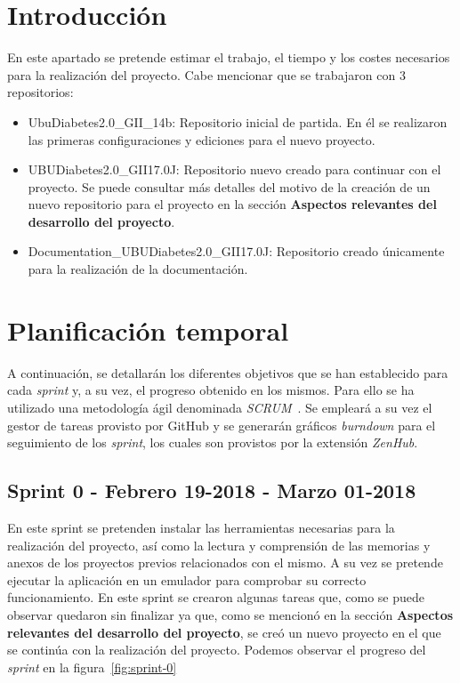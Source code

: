 
\section{Introducción}
En este apartado se pretende estimar el trabajo, el tiempo y los costes necesarios para la realización del proyecto.
Cabe mencionar que se trabajaron con 3 repositorios:
\begin{itemize}
	\item UbuDiabetes2.0\_GII\_14b: Repositorio inicial de partida. En él se realizaron las primeras configuraciones y ediciones para el nuevo proyecto.
	\item UBUDiabetes2.0\_GII17.0J: Repositorio nuevo creado para continuar con el proyecto. Se puede consultar más detalles del motivo de la creación de un nuevo repositorio para el proyecto en la sección \textbf{Aspectos relevantes del desarrollo del proyecto}.
	\item Documentation\_UBUDiabetes2.0\_GII17.0J: Repositorio creado únicamente para la realización de la documentación.
\end{itemize}



\section{Planificación temporal}
A continuación, se detallarán los diferentes objetivos que se han establecido para cada \textit{sprint} y, a su vez, el progreso obtenido en los mismos. Para ello se ha utilizado una metodología ágil denominada \textit{SCRUM}~\cite{schwaber2002agile}. Se empleará a su vez el gestor de tareas provisto por GitHub y se generarán gráficos \textit{burndown} para el seguimiento de los \textit{sprint}, los cuales son provistos por la extensión \textit{ZenHub}.
\subsection{Sprint 0 - Febrero 19-2018 - Marzo 01-2018}
En este sprint se pretenden instalar las herramientas necesarias para la realización del proyecto, así como la lectura y comprensión de las memorias y anexos de los proyectos previos relacionados con el mismo. A su vez se pretende ejecutar la aplicación en un emulador para comprobar su correcto funcionamiento.
En este sprint se crearon algunas tareas que, como se puede observar quedaron sin finalizar ya que, como se mencionó en la sección \textbf{Aspectos relevantes del desarrollo del proyecto}, se creó un nuevo proyecto en el que se continúa con la realización del proyecto.
Podemos observar el progreso del \textit{sprint} en la figura~\ref{fig:sprint-0}
